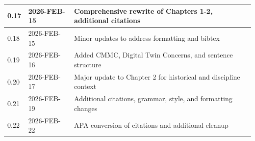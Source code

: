 \begin{table}[H]
\begin{tabular}{@{}lll@{}}
    \midrule
    0.17 & 2026-FEB-15 & Comprehensive rewrite of Chapters 1-2, additional citations\\
    \midrule
    0.18 & 2026-FEB-15 & Minor updates to address formatting and bibtex\\
    \midrule
    0.19 & 2026-FEB-16 & Added CMMC, Digital Twin Concerns, and sentence structure\\
    \midrule
    0.20 & 2026-FEB-17 & Major update to Chapter 2 for historical and discipline context\\
    \midrule
    0.21 & 2026-FEB-19 & Additional citations, grammar, style, and formatting changes\\
        \midrule
    0.22 & 2026-FEB-22 & APA conversion of citations and additional cleanup\\
    \bottomrule
  \end{tabular}
\end{table}
